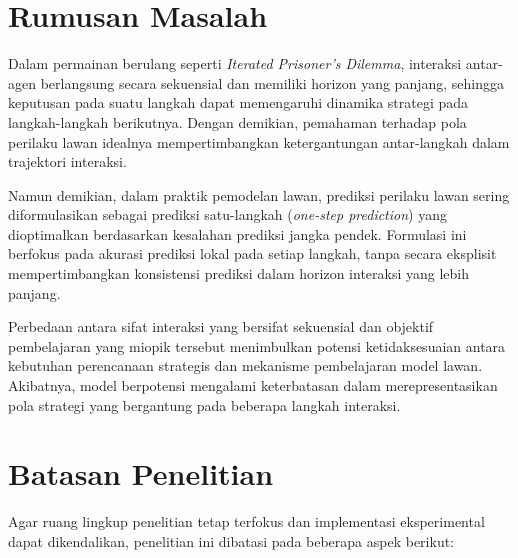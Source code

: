 \section{Rumusan Masalah}
Dalam permainan berulang seperti \textit{Iterated Prisoner's Dilemma}, interaksi antar-agen berlangsung secara sekuensial dan memiliki horizon yang panjang, sehingga keputusan pada suatu langkah dapat memengaruhi dinamika strategi pada langkah-langkah berikutnya. Dengan demikian, pemahaman terhadap pola perilaku lawan idealnya mempertimbangkan ketergantungan antar-langkah dalam trajektori interaksi.

Namun demikian, dalam praktik pemodelan lawan, prediksi perilaku lawan sering diformulasikan sebagai prediksi satu-langkah (\textit{one-step prediction}) yang dioptimalkan berdasarkan kesalahan prediksi jangka pendek. Formulasi ini berfokus pada akurasi prediksi lokal pada setiap langkah, tanpa secara eksplisit mempertimbangkan konsistensi prediksi dalam horizon interaksi yang lebih panjang.

Perbedaan antara sifat interaksi yang bersifat sekuensial dan objektif pembelajaran yang miopik tersebut menimbulkan potensi ketidaksesuaian antara kebutuhan perencanaan strategis dan mekanisme pembelajaran model lawan. Akibatnya, model berpotensi mengalami keterbatasan dalam merepresentasikan pola strategi yang bergantung pada beberapa langkah interaksi.

\section{Batasan Penelitian}

Agar ruang lingkup penelitian tetap terfokus dan implementasi eksperimental dapat dikendalikan, penelitian ini dibatasi pada beberapa aspek berikut:

